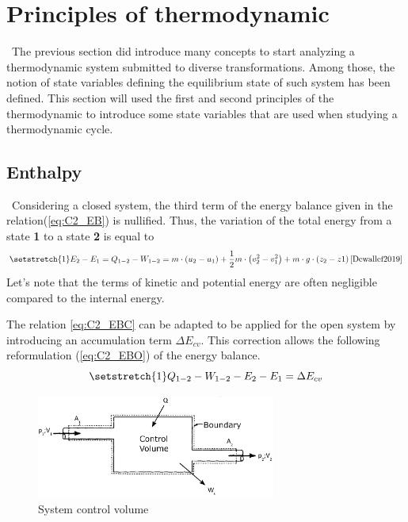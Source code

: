 \section{Principles of thermodynamic}

\quad\, The previous section did introduce many concepts to start analyzing a thermodynamic system submitted to diverse transformations. Among those, the notion of state variables defining the equilibrium state of such system has been defined. This section will used the first and second principles of the thermodynamic to introduce some state variables that are used when studying a thermodynamic cycle.

\subsection{Enthalpy}
\quad\, Considering a closed system, the third term of the energy balance given in the relation(\ref{eq:C2_EB}) is nullified. Thus, the variation of the total energy from a state \textbf{1} to a state \textbf{2} is equal to
\begin{equation}
\setstretch{1}
E_{2} - E_{1} = Q_{1-2} - W_{1-2} = m\cdot\left(u_2 - u_1\right) + \frac{1}{2}m\cdot\left(v^2_2 - v^2_1\right) + m\cdot g\cdot\left(z_2 - z1\right)\citep{Dewallef2019} \label{eq:C2_EBC}
\end{equation}
Let's note that the terms of kinetic and potential energy are often negligible compared to the internal energy.  

The relation \ref{eq:C2_EBC} can be adapted to be applied for the open system by introducing an accumulation term $\Delta E_{cv}$. This correction allows the following reformulation (\ref{eq:C2_EBO}) of the energy balance.
\begin{equation}
\setstretch{1}
Q_{1-2} - W_{1-2} - E_{2} - E_{1} = \Delta E_{cv}\label{eq:C2_EBO}
\end{equation}

\begin{figure}[h]
\centering
\includegraphics[width=0.7\textwidth]{control_volume.png}
\caption{System control volume \cite{Dewallef2019}}
\label{fig:C2_VC}
\end{figure}

